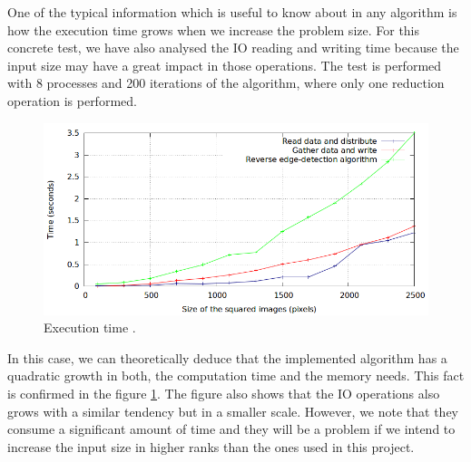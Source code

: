 \documentclass[12pt, a4paper, oneside]{article}
\begin{document}
One of the typical information which is useful to know about in any algorithm is how the execution time grows when we increase the problem size.
For this concrete test, we have also analysed the IO reading and writing time because the input size may have a great impact in those operations.
The test is performed with 8 processes and 200 iterations of the algorithm, where only one reduction operation is performed.

\begin{figure}[htbp]
 \centering
 \includegraphics[width=\textwidth]{plots/imagesize}
 \caption{Execution time .}
 \label{figure:size}
\end{figure}

In this case, we can theoretically deduce that the implemented algorithm has a quadratic growth in both, the computation time and the memory needs.
This fact is confirmed in the figure \ref{figure:size}.
The figure also shows that the IO operations also grows with a similar tendency but in a smaller scale.
However, we note that they consume a significant amount of time and they will be a problem if we intend to increase the input size in higher ranks than the ones used in this project.
\end{document}
